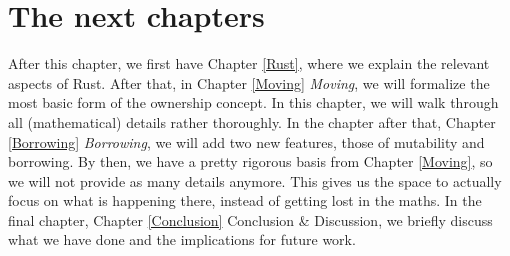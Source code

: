 \section{The next chapters}
After this chapter, we first have Chapter \ref{Rust}, where we explain the relevant aspects of Rust. After that, in Chapter \ref{Moving} \emph{Moving}, we will formalize the most basic form of the ownership concept. In this chapter, we will walk through all (mathematical) details rather thoroughly. In the chapter after that, Chapter \ref{Borrowing} \emph{Borrowing}, we will add two new features, those of mutability and borrowing. By then, we have a pretty rigorous basis from Chapter \ref{Moving}, so we will not provide as many details anymore. This gives us the space to actually focus on what is happening there, instead of getting lost in the maths. In the final chapter, Chapter \ref{Conclusion} Conclusion \& Discussion, we briefly discuss what we have done and the implications for future work. 
